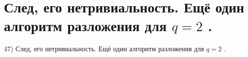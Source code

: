 \section{
 След, его нетривиальность. Ещё один алгоритм разложения для $q = 2$ .
}

47) След, его нетривиальность. Ещё один алгоритм разложения для $q = 2$ .
